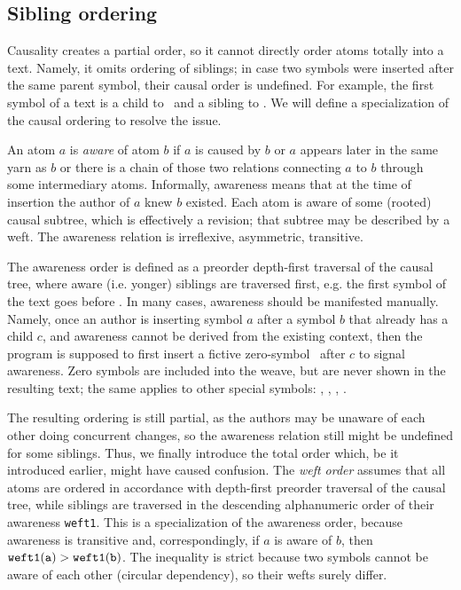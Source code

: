 \documentclass{acm_proc_article-sp}
\begin{document}
\subsection {Sibling ordering}  \label{sec:siblord}

Causality creates a partial order, so it
cannot directly order atoms totally into a text. Namely, it
omits ordering of siblings; in case two symbols were inserted
after the same parent symbol, their causal order is undefined.
For example, the first symbol of a text is a child to \aum
~and a sibling to \eoa. We will define a specialization of  
the causal ordering to resolve the issue.

An atom $a$ is \emph{aware} of atom $b$ if $a$ is caused
by $b$ or $a$ appears later in the same yarn as $b$ or
there is a chain of those two relations connecting $a$ to 
$b$ through some intermediary atoms.
Informally, awareness means that at the time of insertion
the author of $a$ knew $b$ existed. 
Each atom is aware of some (rooted) causal subtree, which
is effectively a revision; that subtree may be described
by a weft.
The awareness relation is irreflexive, asymmetric, transitive.

The awareness order is 
defined as a preorder depth-first traversal of the causal
tree, where aware (i.e. yonger) siblings are traversed first,
e.g. the first symbol of the text goes
before \eoa. In many cases, awareness should be manifested
manually. Namely, once an author is inserting symbol $a$ after
a symbol $b$ that already has a child $c$, and awareness
cannot be derived from the existing context, then the program is
supposed to first insert a fictive zero-symbol \zero ~after $c$
to signal awareness.
Zero symbols are included into the
weave, but are never shown in the resulting text; the same
applies to other special symbols: \aum, \eoa, \bsp, \cnc.

The resulting ordering is still partial, as the authors
may be unaware of each other doing concurrent changes, so
the awareness relation still might be undefined for some
siblings. Thus, we finally introduce the total order
which, be it introduced earlier, might have caused confusion.
The \emph{weft order} assumes that all atoms are ordered in
accordance with depth-first preorder traversal of the causal
tree, while siblings are traversed in the descending 
alphanumeric order of their awareness {\tt weft1}.
This is a specialization of the awareness order, because
awareness is transitive and, correspondingly, if $a$ is
aware of $b$, then $\tt weft1(a) > weft1(b)$. The inequality is
strict because two symbols cannot be aware of each other
(circular dependency), so their wefts surely differ.
\end{document}
